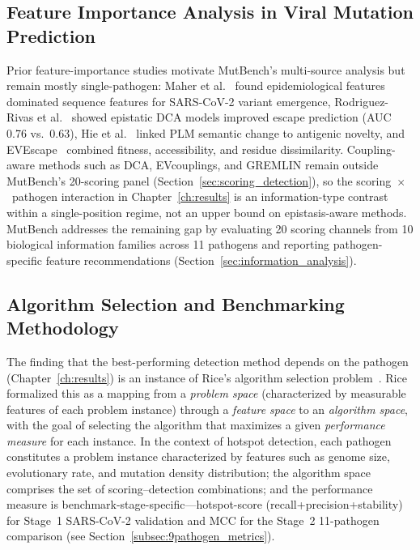 \subsection{Feature Importance Analysis in Viral Mutation Prediction}
\label{subsec:bg_feature_importance}

Prior feature-importance studies motivate MutBench's multi-source analysis but remain mostly single-pathogen: Maher et al.~\cite{maher2022predicting} found epidemiological features dominated sequence features for SARS-CoV-2 variant emergence, Rodriguez-Rivas et al.~\cite{rodriguez2022epistatic} showed epistatic DCA models improved escape prediction (AUC 0.76 vs.\ 0.63), Hie et al.~\cite{hie2021learning} linked PLM semantic change to antigenic novelty, and EVEscape~\cite{thadani2023evescape} combined fitness, accessibility, and residue dissimilarity.
Coupling-aware methods such as DCA, EVcouplings, and GREMLIN remain outside MutBench's 20-scoring panel (Section~\ref{sec:scoring_detection}), so the scoring~$\times$~pathogen interaction in Chapter~\ref{ch:results} is an information-type contrast within a single-position regime, not an upper bound on epistasis-aware methods.
MutBench addresses the remaining gap by evaluating 20 scoring channels from 10 biological information families across 11 pathogens and reporting pathogen-specific feature recommendations (Section~\ref{sec:information_analysis}).

\subsection{Algorithm Selection and Benchmarking Methodology}
\label{subsec:bg_algorithm_selection}

The finding that the best-performing detection method depends on the pathogen (Chapter~\ref{ch:results}) is an instance of Rice's algorithm selection problem~\cite{rice1976algorithm}.
Rice formalized this as a mapping from a \textit{problem space} (characterized by measurable features of each problem instance) through a \textit{feature space} to an \textit{algorithm space}, with the goal of selecting the algorithm that maximizes a given \textit{performance measure} for each instance.
In the context of hotspot detection, each pathogen constitutes a problem instance characterized by features such as genome size, evolutionary rate, and mutation density distribution; the algorithm space comprises the set of scoring--detection combinations; and the performance measure is benchmark-stage-specific---hotspot-score (recall+precision+stability) for Stage~1 SARS-CoV-2 validation and MCC for the Stage~2 11-pathogen comparison (see Section~\ref{subsec:9pathogen_metrics}).

